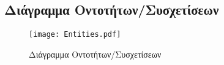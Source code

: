 \begin{center}
\end{center}


\subsection{Διάγραμμα Οντοτήτων/Συσχετίσεων}

\begin{figure}[H]
  \centering
  \texttt{[image: Entities.pdf]}
  \caption{Διάγραμμα Οντοτήτων/Συσχετίσεων}
\end{figure}


